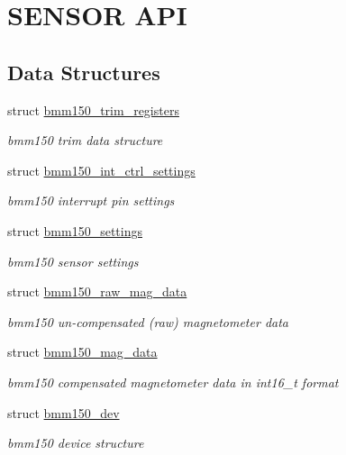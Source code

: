 \hypertarget{group___b_m_m150}{}\section{S\+E\+N\+S\+OR A\+PI}
\label{group___b_m_m150}
\subsection*{Data Structures}
\begin{DoxyCompactItemize}
\item 
struct \hyperlink{structbmm150__trim__registers}{bmm150\+\_\+trim\+\_\+registers}
\begin{DoxyCompactList}\small\item\em bmm150 trim data structure \end{DoxyCompactList}\item 
struct \hyperlink{structbmm150__int__ctrl__settings}{bmm150\+\_\+int\+\_\+ctrl\+\_\+settings}
\begin{DoxyCompactList}\small\item\em bmm150 interrupt pin settings \end{DoxyCompactList}\item 
struct \hyperlink{structbmm150__settings}{bmm150\+\_\+settings}
\begin{DoxyCompactList}\small\item\em bmm150 sensor settings \end{DoxyCompactList}\item 
struct \hyperlink{structbmm150__raw__mag__data}{bmm150\+\_\+raw\+\_\+mag\+\_\+data}
\begin{DoxyCompactList}\small\item\em bmm150 un-\/compensated (raw) magnetometer data \end{DoxyCompactList}\item 
struct \hyperlink{structbmm150__mag__data}{bmm150\+\_\+mag\+\_\+data}
\begin{DoxyCompactList}\small\item\em bmm150 compensated magnetometer data in int16\+\_\+t format \end{DoxyCompactList}\item 
struct \hyperlink{structbmm150__dev}{bmm150\+\_\+dev}
\begin{DoxyCompactList}\small\item\em bmm150 device structure \end{DoxyCompactList}\end{DoxyCompactItemize}

